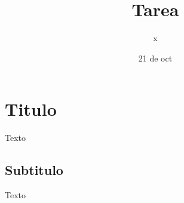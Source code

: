 \documentclass[10pt]{report}
\title{Tarea }
\author{x}
\date{21 de oct}
\begin{document}
\maketitle

\section*{Titulo}
Texto

\subsection*{Subtitulo}
Texto
\end{document}

